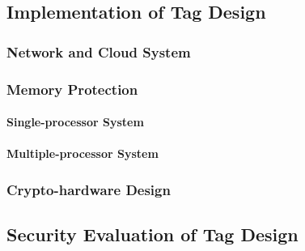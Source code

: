 \documentclass{article}
\begin{document}
\subsection{Implementation of Tag Design}
\subsubsection{Network and Cloud System}
\subsubsection{Memory Protection}
\paragraph{Single-processor System}
\paragraph{Multiple-processor System}
\subsubsection{Crypto-hardware Design}
\subsection{Security Evaluation of Tag Design}
\end{document}
